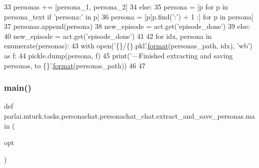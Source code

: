 \begin{DoxyCode}
33                 personas += [persona\_1, persona\_2]
34             \textcolor{keywordflow}{else}:
35                 persona = [p \textcolor{keywordflow}{for} p \textcolor{keywordflow}{in} persona\_text \textcolor{keywordflow}{if} \textcolor{stringliteral}{'persona:'} \textcolor{keywordflow}{in} p]
36                 persona = [p[p.find(\textcolor{stringliteral}{':'}) + 1 :] \textcolor{keywordflow}{for} p \textcolor{keywordflow}{in} persona]
37                 personas.append(persona)
38             new\_episode = act.get(\textcolor{stringliteral}{'episode\_done'})
39         \textcolor{keywordflow}{else}:
40             new\_episode = act.get(\textcolor{stringliteral}{'episode\_done'})
41 
42     \textcolor{keywordflow}{for} idx, persona \textcolor{keywordflow}{in} enumerate(personas):
43         with open(\textcolor{stringliteral}{'\{\}/\{\}.pkl'}.\hyperlink{namespaceparlai_1_1chat__service_1_1services_1_1messenger_1_1shared__utils_a32e2e2022b824fbaf80c747160b52a76}{format}(personas\_path, idx), \textcolor{stringliteral}{'wb'}) \textcolor{keyword}{as} f:
44             pickle.dump(persona, f)
45     print(\textcolor{stringliteral}{'---Finished extracting and saving personas, to \{\}'}.\hyperlink{namespaceparlai_1_1chat__service_1_1services_1_1messenger_1_1shared__utils_a32e2e2022b824fbaf80c747160b52a76}{format}(personas\_path))
46 
47 
\end{DoxyCode}
\mbox{\label{namespaceparlai_1_1mturk_1_1tasks_1_1personachat_1_1personachat__chat_1_1extract__and__save__personas_a3fadfe6571f33f89367defbb1d3907e0}} 
\subsubsection{\texorpdfstring{main()}{main()}}
{\footnotesize\ttfamily def parlai.\+mturk.\+tasks.\+personachat.\+personachat\+\_\+chat.\+extract\+\_\+and\+\_\+save\+\_\+personas.\+main (\begin{DoxyParamCaption}\item[{}]{opt }\end{DoxyParamCaption})}



